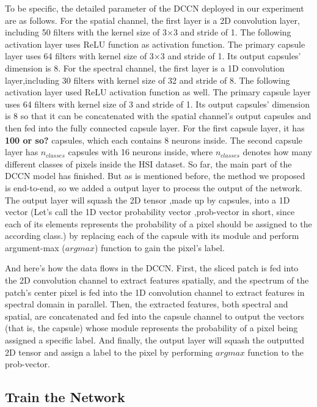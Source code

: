 \documentclass{article}
\begin{document}
	To be specific, the detailed parameter of the DCCN deployed in our experiment are as follows.
	For the spatial channel, the first layer is a 2D convolution layer, including 50 filters with the kernel size of
	3×3 and stride of 1.
	The following activation layer uses ReLU function as activation function.
	The primary capsule layer uses 64 filters with kernel size of 3×3 and stride of 1.
	Its output capsules' dimension is 8.
	For the spectral channel, the first layer is a 1D convolution layer,including 30 filters with kernel size of 32 and
	stride of 8.
	The following activation layer used ReLU activation function as well.
	The primary capsule layer uses 64 filters with kernel size of 3 and stride of 1.
	Its output capsules' dimension is 8 so that it can be concatenated with the spatial channel's output capsules and
	then fed into the fully connected capsule layer.
	For the first capsule layer, it has \textbf{100 or so?} capsules, which each contains 8 neurons inside.
	The second capsule layer has $n_{classes}$ capsules with 16 neurons inside, where $n_{classes}$ denotes how many
	different classes of pixels inside the HSI dataset.
	So far, the main part of the DCCN model has finished.
	But as is mentioned before, the method we proposed is end-to-end, so we added a output layer to process the output
	of the network.
	The output layer will squash the 2D tensor ,made up by capsules, into a 1D vector (Let's call the 1D vector
	probability vector ,prob-vector in short, since each of its elements represents the probability of a pixel should
	be assigned to the according class.) by replacing each of the capsule with its module and perform argument-max
	($argmax$) function to gain the pixel's label.


	And here's how the data flows in the DCCN.
	First, the sliced patch is fed into the 2D convolution channel to extract features spatially, and the spectrum
	of the patch's center pixel is fed into the 1D convolution channel to extract features in spectral domain in
	parallel.
	Then, the extracted features, both spectral and spatial, are concatenated and fed into the capsule channel to output
	the vectors (that is, the capsule) whose module represents the probability of a pixel being assigned a specific
	label.
	And finally, the output layer will squash the outputted 2D tensor and assign a label to the pixel by performing
	$argmax$ function to the prob-vector.

	\subsection{Train the Network}\label{subsec:train-the-network}
\end{document}
